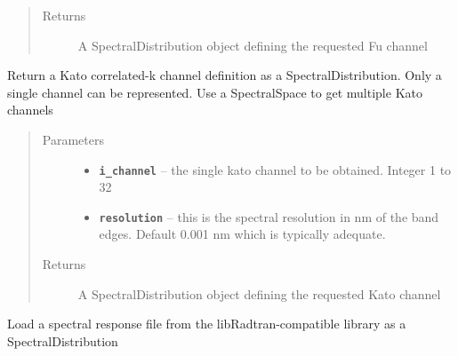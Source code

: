 \documentclass[a4paper,10pt,english]{sphinxmanual}
\begin{document}
\begin{fulllineitems}
\begin{fulllineitems}
\begin{quote}
\begin{description}
\begin{itemize}
\end{itemize}

\item[{Returns}] \leavevmode
A SpectralDistribution object defining the requested Fu channel

\end{description}\end{quote}

\end{fulllineitems}


\begin{fulllineitems}
\label{packages:radute.SpectralDistribution.kato}
Return a Kato correlated-k channel definition as a SpectralDistribution. Only a single channel can
be represented. Use a SpectralSpace to get multiple Kato channels
\begin{quote}\begin{description}
\item[{Parameters}] \leavevmode\begin{itemize}
\item {} 
\textbf{\texttt{i\_channel}} -- the single kato channel to be obtained. Integer 1 to 32

\item {} 
\textbf{\texttt{resolution}} -- this is the spectral resolution in nm of the band edges. Default 0.001 nm
which is typically adequate.

\end{itemize}

\item[{Returns}] \leavevmode
A SpectralDistribution object defining the requested Kato channel

\end{description}\end{quote}

\end{fulllineitems}


\begin{fulllineitems}
\label{packages:radute.SpectralDistribution.sensor_channel}
Load a spectral response file from the libRadtran-compatible library as a SpectralDistribution


\end{fulllineitems}
\end{fulllineitems}
\end{document}
